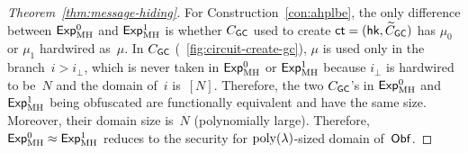 \begin{proof}
[%
Theorem~\ref{thm:message-hiding}]
For Construction~\ref{con:ahplbe},
the only difference between $\ExpMH{0}$ and $\ExpMH{1}$ is
whether $C_\GC$ used to create ${\ct=(\hk,\widetilde{C}_\GC)}$
has $\mu_0$ or $\mu_1$ hardwired as~$\mu$.
In $C_\GC$ (\Figure~\ref{fig:circuit-create-gc}),
$\mu$ is used only in the branch~${i>i_\bot}$,
which is never taken in $\ExpMH{0}$ or $\ExpMH{1}$
because $i_\bot$ is hardwired to be~$N$ and the domain of~$i$ is~$[N]$.
Therefore, the two $C_\GC$'s in $\ExpMH{0}$ and $\ExpMH{1}$ being obfuscated are functionally equivalent and have the same size.
Moreover, their domain size is~$N$ (polynomially large).
Therefore, ${\ExpMH{0}\approx\ExpMH{1}}$ reduces to the {\iO} security for $\operatorname{poly}(\lambda)$-sized domain of~$\Obf$.
\end{proof}
